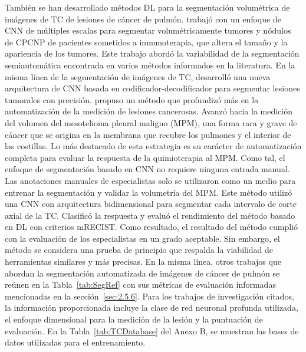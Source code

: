 \documentclass[11pt,a4paper,openany]{article}
\begin{document}
        También se han desarrollado métodos DL para la segmentación volumétrica de imágenes de TC de lesiones de cáncer de pulmón. \cite{Jiang2019} trabajó con un enfoque de CNN de múltiples escalas para segmentar volumétricamente tumores y nódulos de CPCNP de pacientes sometidos a inmunoterapia, que altera el tamaño y la apariencia de los tumores. Este trabajo abordó la variabilidad de la segmentación semiautomática encontrada en varios métodos informados en la literatura. En la misma línea de la segmentación de imágenes de TC, \cite{Chen2021} desarrolló una nueva arquitectura de CNN basada en codificador-decodificador para segmentar lesiones tumorales con precisión. \cite{Kidd2022} propuso un método que profundizó más en la automatización de la medición de lesiones cancerosas. Avanzó hacia la medición del volumen del mesotelioma pleural maligno (MPM), una forma rara y grave de cáncer que se origina en la membrana que recubre los pulmones y el interior de las costillas. Lo más destacado de esta estrategia es su carácter de automatización completa para evaluar la respuesta de la quimioterapia al MPM. Como tal, el enfoque de segmentación basado en CNN no requiere ninguna entrada manual. Las anotaciones manuales de especialistas solo se utilizaron como un medio para entrenar la segmentación y validar la volumetría del MPM. Este método utilizó una CNN con arquitectura bidimensional para segmentar cada intervalo de corte axial de la TC. Clasificó la respuesta y evaluó el rendimiento del método basado en DL con criterios mRECIST. Como resultado, el resultado del método cumplió con la evaluación de los especialistas en un grado aceptable. Sin embargo, el método se considera una prueba de principio que respalda la viabilidad de herramientas similares y más precisas. En la misma línea, otros trabajos que abordan la segmentación automatizada de imágenes de cáncer de pulmón se reúnen en la Tabla~\ref{tab:SegRef} con sus métricas de evaluación informadas mencionadas en la sección~\ref{sec:2.5.6}. Para los trabajos de investigación citados, la información proporcionada incluye la clase de red neuronal profunda utilizada, el enfoque dimensional para la medición de la lesión y la puntuación de evaluación. En la Tabla~\ref{tab:TCDatabase} del Anexo B, se muestran las bases de datos utilizadas para el entrenamiento.
\end{document}
